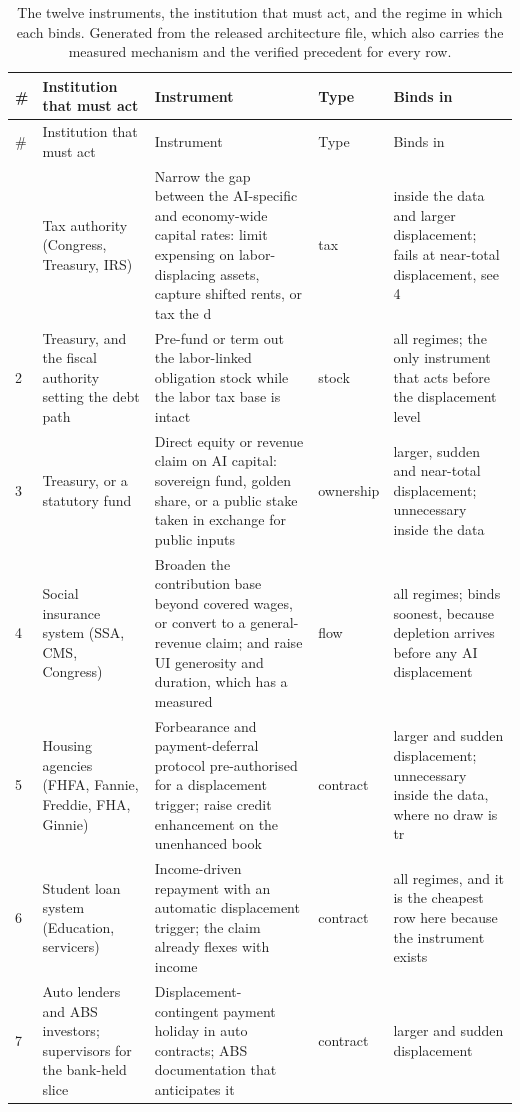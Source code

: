 \begin{longtable}{@{}p{0.4cm}p{3.0cm}p{5.0cm}p{1.4cm}p{3.4cm}@{}}
\caption{The twelve instruments, the institution that must act, and the regime in which each binds. Generated from the released architecture file, which also carries the measured mechanism and the verified precedent for every row.}\label{tab:instruments}\\
\toprule
\# & Institution that must act & Instrument & Type & Binds in \\
\midrule
\endfirsthead
\toprule
\# & Institution that must act & Instrument & Type & Binds in \\
\midrule
\endhead
\bottomrule
\endfoot
1 & Tax authority (Congress, Treasury, IRS) & Narrow the gap between the AI-specific and economy-wide capital rates: limit expensing on labor-displacing assets, capture shifted rents, or tax the d & tax & inside the data and larger displacement; fails at near-total displacement, see 4 \\
2 & Treasury, and the fiscal authority setting the debt path & Pre-fund or term out the labor-linked obligation stock while the labor tax base is intact & stock & all regimes; the only instrument that acts before the displacement level \\
3 & Treasury, or a statutory fund & Direct equity or revenue claim on AI capital: sovereign fund, golden share, or a public stake taken in exchange for public inputs & ownership & larger, sudden and near-total displacement; unnecessary inside the data \\
4 & Social insurance system (SSA, CMS, Congress) & Broaden the contribution base beyond covered wages, or convert to a general-revenue claim; and raise UI generosity and duration, which has a measured  & flow & all regimes; binds soonest, because depletion arrives before any AI displacement \\
5 & Housing agencies (FHFA, Fannie, Freddie, FHA, Ginnie) & Forbearance and payment-deferral protocol pre-authorised for a displacement trigger; raise credit enhancement on the unenhanced book & contract & larger and sudden displacement; unnecessary inside the data, where no draw is tr \\
6 & Student loan system (Education, servicers) & Income-driven repayment with an automatic displacement trigger; the claim already flexes with income & contract & all regimes, and it is the cheapest row here because the instrument exists \\
7 & Auto lenders and ABS investors; supervisors for the bank-held slice & Displacement-contingent payment holiday in auto contracts; ABS documentation that anticipates it & contract & larger and sudden displacement \\

\end{longtable}
